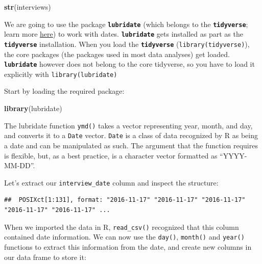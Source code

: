 \documentclass[]{book}
\newenvironment{Shaded}{\begin{snugshade}}{\end{snugshade}}
\newcommand{\KeywordTok}[1]{\textcolor[rgb]{0.13,0.29,0.53}{\textbf{#1}}}
\newcommand{\StringTok}[1]{\textcolor[rgb]{0.31,0.60,0.02}{#1}}
\newcommand{\OperatorTok}[1]{\textcolor[rgb]{0.81,0.36,0.00}{\textbf{#1}}}
\newcommand{\NormalTok}[1]{#1}
\begin{document}
\begin{Shaded}
\begin{Highlighting}[]
\KeywordTok{str}\NormalTok{(interviews)}
\end{Highlighting}
\end{Shaded}

We are going to use the package \textbf{\texttt{lubridate}} (which
belongs to the \textbf{\texttt{tidyverse}}; learn more
\href{https://www.tidyverse.org/}{here}) to work with dates.
\textbf{\texttt{lubridate}} gets installed as part as the
\textbf{\texttt{tidyverse}} installation. When you load the
\textbf{\texttt{tidyverse}} (\texttt{library(tidyverse)}), the core
packages (the packages used in most data analyses) get loaded.
\textbf{\texttt{lubridate}} however does not belong to the core
tidyverse, so you have to load it explicitly with
\texttt{library(lubridate)}

Start by loading the required package:

\begin{Shaded}
\begin{Highlighting}[]
\KeywordTok{library}\NormalTok{(lubridate)}
\end{Highlighting}
\end{Shaded}

The lubridate function \texttt{ymd()} takes a vector representing year,
month, and day, and converts it to a \texttt{Date} vector. \texttt{Date}
is a class of data recognized by R as being a date and can be
manipulated as such. The argument that the function requires is
flexible, but, as a best practice, is a character vector formatted as
``YYYY-MM-DD''.

Let's extract our \texttt{interview\_date} column and inspect the
structure:

\begin{Shaded}
\end{Shaded}

\begin{verbatim}
##  POSIXct[1:131], format: "2016-11-17" "2016-11-17" "2016-11-17" "2016-11-17" "2016-11-17" ...
\end{verbatim}

When we imported the data in R, \texttt{read\_csv()} recognized that
this column contained date information. We can now use the
\texttt{day()}, \texttt{month()} and \texttt{year()} functions to
extract this information from the date, and create new columns in our
data frame to store it:
\end{document}
